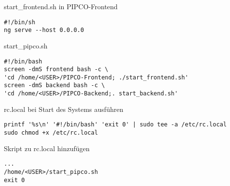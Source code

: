 start\_frontend.sh in PIPCO-Frontend
\begin{lstlisting}[frame=single]
#!/bin/sh
ng serve --host 0.0.0.0
\end{lstlisting}

start\_pipco.sh
\begin{lstlisting}[frame=single]
#!/bin/bash
screen -dmS frontend bash -c \
'cd /home/<USER>/PIPCO-Frontend; ./start_frontend.sh'
screen -dmS backend bash -c \
'cd /home/<USER>/PIPCO-Backend;. start_backend.sh'
\end{lstlisting}

rc.local bei Start des Systems ausführen
\begin{lstlisting}[frame=single]
printf '%s\n' '#!/bin/bash' 'exit 0' | sudo tee -a /etc/rc.local
sudo chmod +x /etc/rc.local
\end{lstlisting}
Skript zu rc.local hinzufügen
\begin{lstlisting}[frame=single]
...
/home/<USER>/start_pipco.sh
exit 0
\end{lstlisting}